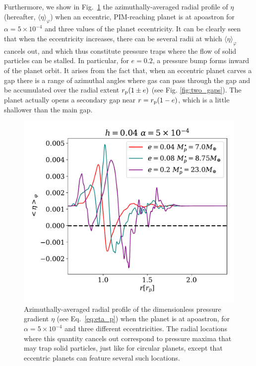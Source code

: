 \documentclass[fleqn,usenatbib]{mnras}
\begin{document}
Furthermore, we show in Fig.~\ref{fig:eta2} the azimuthally-averaged radial profile of $\eta$ (hereafter, $\langle\eta\rangle_{\varphi}$) when an eccentric, PIM-reaching planet is at apoastron for $\alpha=5\times10^{-4}$ and three values of the planet eccentricity. It can be clearly seen that when the eccentricity increases, there can be several radii at which $\langle\eta\rangle_{\varphi}$ cancels out, and which thus constitute pressure traps where the flow of solid particles can be stalled. In particular, for $e=0.2$, a pressure bump forms inward of the planet orbit. It arises from the fact that, when an eccentric planet carves a gap there is a range of azimuthal angles where gas can pass through the gap and be accumulated over the radial extent $r_{\rm p}(1 \pm e)$ (see Fig. \ref{fig:two_gaps}). The planet actually opens a secondary gap near $r=r_{\rm p}(1-e)$, which is a little shallower than the main gap.

\begin{figure}
   \includegraphics[width=1.0\linewidth]{eta_average.pdf}
  \caption{Azimuthally-averaged radial profile of the dimensionless pressure gradient $\eta$ (see Eq.~\ref{eq:eta_p}) when the planet is at apoastron, for $\alpha=5\times10^{-4}$ and three different eccentricities. The radial locations where this quantity cancels out correspond to pressure maxima that may trap solid particles, just like for circular planets, except that eccentric planets can feature several such locations.}
  \label{fig:eta2}
\end{figure}
\end{document}
